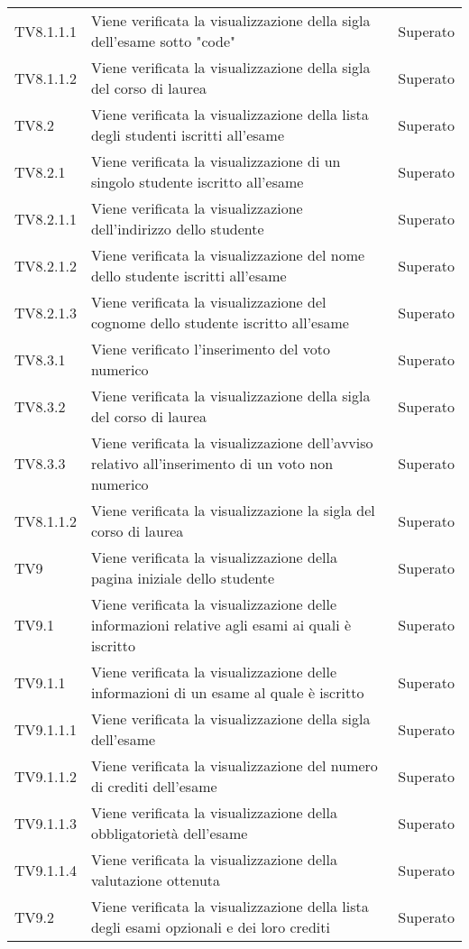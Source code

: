 \documentclass[PianoDiQualifica.tex]{subfiles}
\begin{document}
\begin{longtable}[H]{P{2cm}P{8.5cm}P{3cm}}
	TV8.1.1.1 & Viene verificata la visualizzazione della sigla dell'esame sotto "code" & Superato \\
	TV8.1.1.2 & Viene verificata la visualizzazione della sigla del corso di laurea & Superato \\
	TV8.2 & Viene verificata la visualizzazione della lista degli studenti iscritti all'esame & Superato \\
	TV8.2.1 & Viene verificata la visualizzazione di un singolo studente iscritto all'esame & Superato \\
	TV8.2.1.1 & Viene verificata la visualizzazione dell'indirizzo dello studente & Superato \\
	TV8.2.1.2 & Viene verificata la visualizzazione del nome dello studente iscritti all'esame & Superato \\
	TV8.2.1.3 & Viene verificata la visualizzazione del cognome dello studente iscritto all'esame & Superato \\
	TV8.3.1 & Viene verificato l'inserimento del voto numerico & Superato \\
	TV8.3.2 & Viene verificata la visualizzazione della sigla del corso di laurea & Superato \\
	TV8.3.3 & Viene verificata la visualizzazione dell'avviso relativo all'inserimento di un voto non numerico & Superato \\
	TV8.1.1.2 & Viene verificata la visualizzazione la sigla del corso di laurea & Superato \\
	TV9 & Viene verificata la visualizzazione della pagina iniziale dello studente & Superato \\
	TV9.1 & Viene verificata la visualizzazione delle informazioni relative agli esami ai quali è iscritto & Superato \\
	TV9.1.1 & Viene verificata la visualizzazione delle informazioni di un esame al quale è iscritto & Superato \\
	TV9.1.1.1 & Viene verificata la visualizzazione della sigla dell'esame & Superato \\
	TV9.1.1.2 & Viene verificata la visualizzazione del numero di crediti dell'esame & Superato \\
	TV9.1.1.3 & Viene verificata la visualizzazione della obbligatorietà dell'esame & Superato \\
	TV9.1.1.4 & Viene verificata la visualizzazione della valutazione ottenuta & Superato \\
	TV9.2 & Viene verificata la visualizzazione della lista degli esami opzionali e dei loro crediti & Superato \\

\end{longtable}
\end{document}
